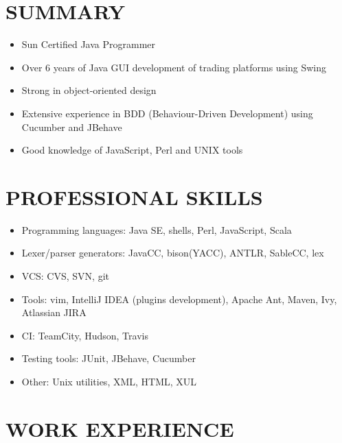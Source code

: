 \documentclass[margin,15pt]{res} %
\newcommand{\gli}[2] {
  {\color{Blue} \href{#1}{#2}}
}
\begin{document}

\address{{\bf Contacts} \\  Saint Petersburg, Russia \\
        \gli{mailto:arkady.galyash@gmail.com?subject=Job}{arkady.galyash@gmail.com} \\
        +7(921) 553-9890 }
\address{}
\begin{resume}
 
\section{SUMMARY}
  \begin{itemize}
    \item Sun Certified Java Programmer 
    \item Over 6 years of Java GUI development of trading platforms using Swing
    \item Strong in object-oriented design
    \item Extensive experience in BDD (Behaviour-Driven Development) using Cucumber and JBehave
    \item Good knowledge of JavaScript, Perl and UNIX tools
  \end{itemize}
\section{PROFESSIONAL SKILLS} 
  \begin{itemize}
     \item Programming languages: Java SE, shells, Perl, JavaScript, Scala
     \item Lexer/parser generators: JavaCC, bison(YACC), ANTLR, SableCC, lex
     \item VCS: CVS, SVN, git
     \item Tools: vim, IntelliJ IDEA (plugins development), Apache Ant, Maven, Ivy, Atlassian JIRA
     \item CI: TeamCity, Hudson, Travis
     \item Testing tools: JUnit, JBehave, Cucumber
     \item Other: Unix utilities, XML, HTML, XUL
  \end{itemize}

\section{WORK EXPERIENCE} 


\end{resume}
\end{document}
